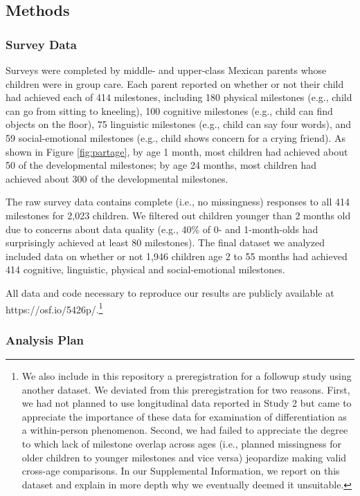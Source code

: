 \documentclass[man, floatsintext]{apa7}
\begin{document}
\subsection{Methods}

\subsubsection{Survey Data}

Surveys were completed by
middle- and upper-class Mexican parents whose children were in group
care. Each parent reported on whether or not
their child had achieved each of 414 milestones, including 180
physical milestones (e.g., child can go from sitting to kneeling), 100
cognitive milestones (e.g., child can find objects on the floor), 75
linguistic milestones (e.g., child can say four words), and 59
social-emotional milestones (e.g., child shows concern for a crying
friend). As shown in Figure \ref{fig:partage}, by age 1 month, most
children had achieved about 50 of the developmental milestones; by
age 24 months, most children had achieved about 300 of the developmental
milestones. 

The raw survey data contains complete (i.e., no missingness)
responses to all 414 milestones for 2,023 children. We filtered out
children younger than 2 months old due to concerns about data quality
(e.g., 40\% of 0- and 1-month-olds had surprisingly achieved at least 80
milestones). The final dataset we analyzed included data on whether or not 1,946 children age 2 to 55
months had achieved 414 cognitive, linguistic, physical and
social-emotional milestones. 

All data and code necessary to reproduce our results are publicly available at https://osf.io/5426p/.\footnote{We also include in this repository a preregistration for a followup study using another dataset. We deviated from this preregistration for two reasons. First, we had not planned to use longitudinal data reported in Study 2 but came to appreciate the importance of these data for examination of differentiation as a within-person phenomenon. Second, we had failed to appreciate the degree to which lack of milestone
overlap across ages (i.e., planned missingness for older children to
younger milestones and vice versa) jeopardize making valid cross-age
comparisons. In our Supplemental Information, we report on this dataset and explain in more depth why we eventually deemed it unsuitable.}

\subsubsection{Analysis Plan}
\end{document}
